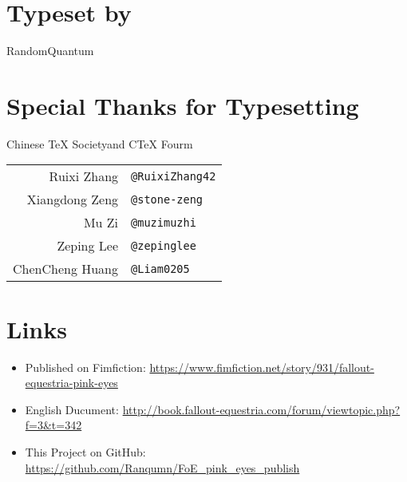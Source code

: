 {\section*{Typeset by}

\begin{center}
    RandomQuantum
\end{center}

\section*{Special Thanks for Typesetting}

\begin{table}[H]
    \centering
    
    \begin{center}
    Chinese \TeX{} Society\footnotemark and C\TeX{} Fourm\footnotemark
    \end{center}
  
    \begin{tabular}{rl}
        Ruixi Zhang & \texttt{@RuixiZhang42} \\
        Xiangdong Zeng & \texttt{@stone-zeng} \\
        Mu Zi & \texttt{@muzimuzhi} \\
        Zeping Lee & \texttt{@zepinglee} \\
        ChenCheng Huang & \texttt{@Liam0205} \\
    \end{tabular}
\end{table}

\addtocounter{footnote}{-2} %



\section*{Links}

\begin{itemize}
    \item Published on Fimfiction: \url{https://www.fimfiction.net/story/931/fallout-equestria-pink-eyes}
    \item English Ducument: \url{http://book.fallout-equestria.com/forum/viewtopic.php?f=3\&t=342}
    \item This Project on GitHub: \url{https://github.com/Ranqumn/FoE_pink_eyes_publish}
\end{itemize}

}

